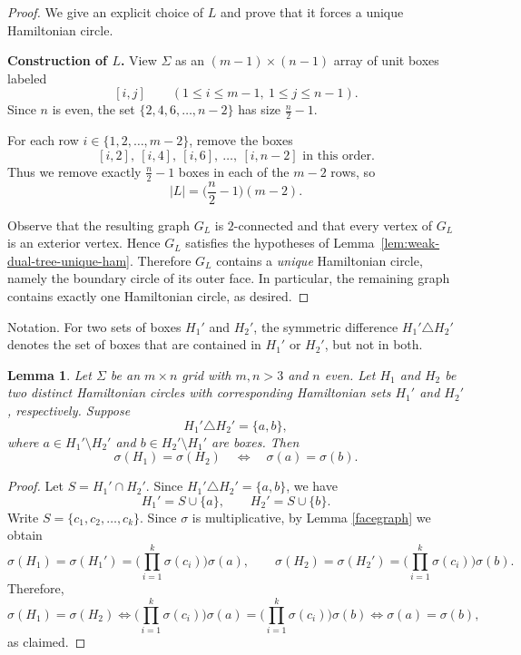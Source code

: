 \documentclass[12pt]{amsart}
\theoremstyle{theorem}%
\newtheorem{lemma}[theorem]{Lemma}
\theoremstyle{definition}%
\begin{document}
\begin{proof}
We give an explicit choice of $L$ and prove that it forces a unique Hamiltonian circle.

\medskip
\noindent\textbf{Construction of $L$.}
View $\Sigma$ as an $(m-1)\times (n-1)$ array of unit boxes labeled
\[
[i,j]\qquad (1\le i\le m-1,\ 1\le j\le n-1).
\]
Since $n$ is even, the set $\{2,4,6,\dots,n-2\}$ has size $\frac n2-1$.

For each row $i\in\{1,2,\dots,m-2\}$, remove the boxes
\[
[i,2],\ [i,4],\ [i,6],\ \dots,\ [i,n-2] \text{ in this order}.
\]
Thus we remove exactly $\frac n2-1$ boxes in each of the $m-2$ rows, so
\[
|L|=\Big(\frac n2-1\Big)(m-2).
\]

\medskip
Observe that the resulting graph $G_L$ is $2$-connected and that every vertex of $G_L$ is an exterior vertex.
Hence $G_L$ satisfies the hypotheses of Lemma~\ref{lem:weak-dual-tree-unique-ham}.
Therefore $G_L$ contains a \emph{unique} Hamiltonian circle, namely the boundary circle of its outer face.
In particular, the remaining graph contains exactly one Hamiltonian circle, as desired.
\end{proof}




Notation. For two sets of boxes $H_1'$ and $H_2'$, the symmetric difference
$H_1' \triangle H_2'$ denotes the set of boxes that are contained in $H_1'$ or $H_2'$, but not in both.



\begin{lemma}\label{lemma123} 
Let $\Sigma$ be an $m\times n$ grid with $m,n>3$ and $n$ even.
Let $H_1$ and $H_2$ be two distinct Hamiltonian circles with corresponding Hamiltonian sets
$H_1'$ and $H_2'$, respectively. Suppose
\[
H_1' \triangle H_2'=\{a,b\},
\]
where $a\in H_1'\setminus H_2'$ and $b\in H_2'\setminus H_1'$ are boxes. Then
\[
\sigma(H_1)=\sigma(H_2)\quad \Longleftrightarrow\quad \sigma(a)=\sigma(b).
\]
\end{lemma}

\begin{proof}
Let $S=H_1'\cap H_2'$. Since $H_1' \triangle H_2'=\{a,b\}$, we have
\[
H_1' = S\cup\{a\}, \qquad H_2' = S\cup\{b\}.
\]
Write $S=\{c_1,c_2,\dots,c_k\}$.  
Since $\sigma$ is multiplicative, by Lemma \ref{facegraph} we obtain
\[
\sigma(H_1)=\sigma(H_1')=\Big(\prod_{i=1}^k \sigma(c_i)\Big)\sigma(a),
\qquad
\sigma(H_2)=\sigma(H_2')=\Big(\prod_{i=1}^k \sigma(c_i)\Big)\sigma(b).
\]
Therefore,
\[
\sigma(H_1)=\sigma(H_2)
\iff
\Big(\prod_{i=1}^k \sigma(c_i)\Big)\sigma(a)
=
\Big(\prod_{i=1}^k \sigma(c_i)\Big)\sigma(b)
\iff
\sigma(a)=\sigma(b),
\]
as claimed.
\end{proof}
\end{document}
